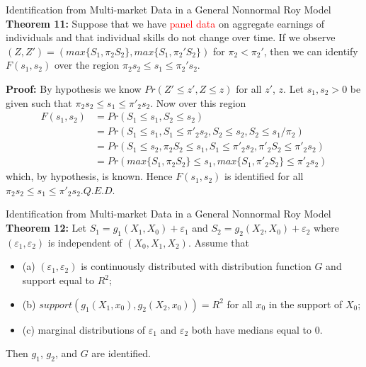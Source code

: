 \documentclass{beamer}
\begin{document}
\begin{frame}{Identification from Multi-market Data in a General Nonnormal Roy Model}
\textbf{Theorem 11:}  Suppose that we have \textcolor{red}{panel data} on aggregate earnings of individuals and that individual skills do not change over time. If we observe $(Z,Z' )=(max\{S_1,\pi_2 S_2\},max\{S_1,\pi_2'S_2\})$ for $\pi_2<\pi_2'$, then we can identify $F(s_1,s_2)$ over the region $\pi_2s_2\leq s_1\leq \pi_2's_2$.

\bigskip
\textbf{Proof:} By hypothesis we know $Pr(Z'\leq z',Z\leq z)$ for all $z'$, $z$. Let $s_1,s_2>0$ be given such that $\pi_2s_2\leq s_1\leq \pi'_2s_2$. Now over this region
	\begin{equation}\nonumber
	\begin{aligned}
	F(s_1,s_2)&=Pr(S_1\leq s_1,S_2\leq s_2)\\
	&=Pr(S_1\leq s_1,S_1\leq \pi'_2s_2,S_2\leq s_2,S_2\leq s_1/\pi_2)\\
	&=Pr(S_1\leq s_2,\pi_2S_2\leq s_1,S_1\leq \pi'_2s_2,\pi'_2S_2\leq \pi'_2s_2)\\
	&=Pr(max\{S_1,\pi_2S_2\}\leq s_1,max\{S_1,\pi'_2S_2\}\leq \pi'_2s_2)
	\end{aligned}
	\end{equation}
which, by hypothesis, is known. Hence $F(s_1,s_2)$ is identified for all $\pi_2s_2\leq s_1\leq \pi'_2s_2$.\hfill $Q.E.D.$
\end{frame}

\begin{frame}{Identification from Multi-market Data in a General Nonnormal Roy Model}
	\textbf{Theorem 12:} Let $S_1=g_1(X_1,X_0)+\varepsilon_1$ and $S_2=g_2 (X_2,X_0 )+\varepsilon_2$ where $(\varepsilon_1,\varepsilon_2)$ is independent of $(X_0,X_1,X_2 )$. Assume that
	\begin{itemize}
		\item (a) $(\varepsilon_1,\varepsilon_2)$ is continuously distributed with distribution function $G$ and support equal to $R^2$;
		\item (b) $support(g_1 (X_1,x_0 ),g_2 (X_2,x_0 ))=R^2$ for all $x_0$ in the support of $X_0$;
		\item (c) marginal distributions of $\varepsilon_1$ and $\varepsilon_2$ both have medians equal to $0$.
	\end{itemize}
	Then $g_1$, $g_2$, and $G$ are identified.
\end{frame}
\end{document}
